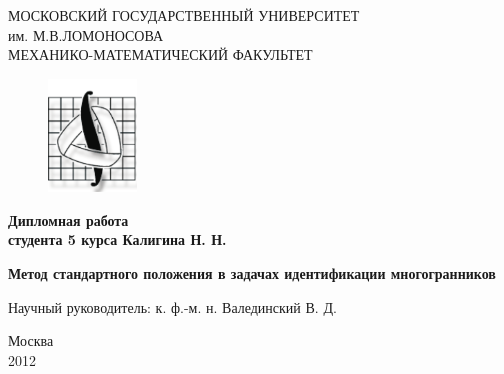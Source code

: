 \documentclass[a4paper,12pt, titlepage]{article}
\begin{document}
\begin{titlepage}
\begin{center}
МОСКОВСКИЙ ГОСУДАРСТВЕННЫЙ УНИВЕРСИТЕТ\\
им. М.В.ЛОМОНОСОВА\\
МЕХАНИКО-МАТЕМАТИЧЕСКИЙ ФАКУЛЬТЕТ
\end{center}
\vspace{1cm}
\begin{figure}[h]
\centering
\centerline{\includegraphics[height=3cm]{mebiusPDF.pdf}}
\end{figure}

\vspace{2cm}
\begin{center}
\large \bf{Дипломная работа}\\
студента 5 курса Калигина Н. Н.
\end{center}
\vspace{2cm}
\begin{center}
\LARGE \bf{Метод стандартного положения в задачах идентификации многогранников}
\end{center}

\vspace{3cm}

\large
\begin{flushright}
Научный руководитель: к. ф.-м. н. Валединский В. Д.
\end{flushright}

\vspace{2cm}

\begin{center}
Москва\\2012
\end{center}

\end{titlepage}

\tableofcontents
\end{document}
